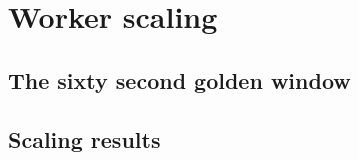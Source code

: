 \section{Worker scaling}

\subsection{The sixty second golden window}

\subsection{Scaling results}\label{sec:worker-scaling-results}
